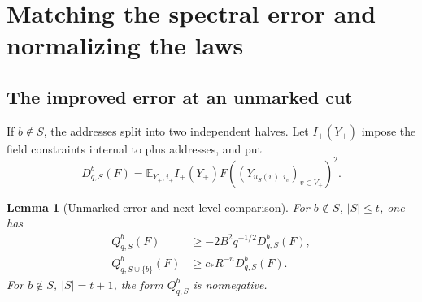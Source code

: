 \documentclass[11pt,a4paper]{article}
\numberwithin{equation}{section}
\newtheorem{lemma}[theorem]{Lemma}
\theoremstyle{definition}
\theoremstyle{remark}
\newcommand{\E}{\mathbb E}
\begin{document}
\section{Matching the spectral error and normalizing the laws}
\label{sec:normalization}

\subsection{The improved error at an unmarked cut}

If $b\notin S$, the addresses split into two independent halves.
Let $I_+(Y_+)$ impose the field constraints internal to plus addresses,
and put
\[
 D_{q,S}^b(F)=\E_{Y_+,i_+}I_+(Y_+)
            F((Y_{u_S(v),i_v})_{v\in V_+})^2.
\]

\begin{lemma}[Unmarked error and next-level comparison]
\label{lem:unmarked}
For $b\notin S$, $|S|\le t$, one has
\begin{align}
 Q_{q,S}^b(F)&\ge-2B^2q^{-1/2}D_{q,S}^b(F),
       \label{eq:unmarkednew}\\
 Q_{q,S\cup\{b\}}^b(F)&\ge c_*R^{-n}D_{q,S}^b(F).
       \label{eq:nextlevel}
\end{align}
For $b\notin S$, $|S|=t+1$, the form $Q_{q,S}^b$ is nonnegative.
\end{lemma}
\end{document}
